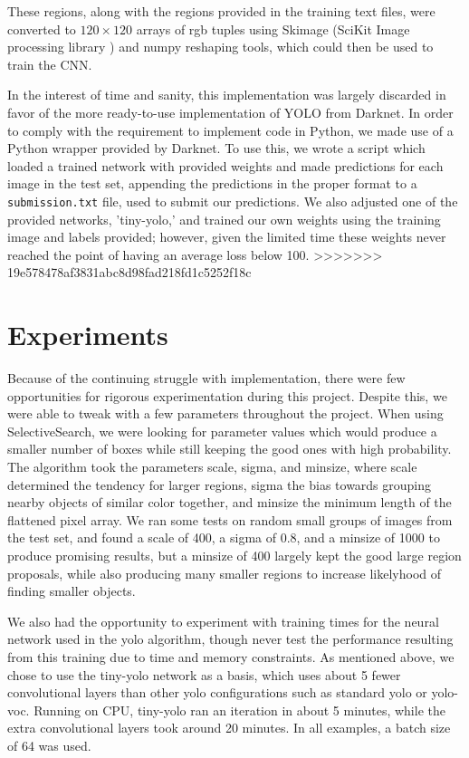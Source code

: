 \documentclass[10pt]{article}
\begin{document}
These regions, along with the regions provided in the training text files, were converted to $120\times 120$ arrays of rgb tuples using Skimage (SciKit Image processing library \cite{skimage}) and numpy reshaping tools, which could then be used to train the CNN.

In the interest of time and sanity, this implementation was largely discarded in favor of the more ready-to-use implementation of YOLO from Darknet. In order to comply with the requirement to implement code in Python, we made use of a Python wrapper provided by Darknet. To use this, we wrote a script which loaded a trained network with provided weights and made predictions for each image in the test set, appending the predictions in the proper format to a \texttt{submission.txt} file, used to submit our predictions. We also adjusted one of the provided networks, 'tiny-yolo,' and trained our own weights using the training image and labels provided; however, given the limited time these weights never reached the point of having an average loss below 100.
>>>>>>> 19e578478af3831abc8d98fad218fd1c5252f18c

\section{Experiments}

Because of the continuing struggle with implementation, there were few opportunities for rigorous experimentation during this project. Despite this, we were able to tweak with a few parameters throughout the project. When using SelectiveSearch, we were looking for parameter values which would produce a smaller number of boxes while still keeping the good ones with high probability. The algorithm took the parameters scale, sigma, and minsize, where scale determined the tendency for larger regions, sigma the bias towards grouping nearby objects of similar color together, and minsize the minimum length of the flattened pixel array. We ran some tests on random small groups of images from the test set, and found a scale of 400, a sigma of 0.8, and a minsize of 1000 to produce promising results, but a minsize of 400 largely kept the good large region proposals, while also producing many smaller regions to increase likelyhood of finding smaller objects. 

We also had the opportunity to experiment with training times for the neural network used in the yolo algorithm, though never test the performance resulting from this training due to time and memory constraints. As mentioned above, we chose to use the tiny-yolo network as a basis, which uses about 5 fewer convolutional layers than other yolo configurations such as standard yolo or yolo-voc. Running on CPU, tiny-yolo ran an iteration in about 5 minutes, while the extra convolutional layers took around 20 minutes. In all examples, a batch size of 64 was used.
\end{document}
